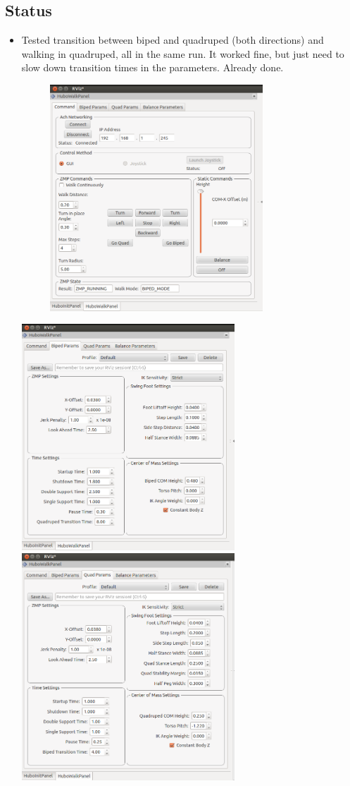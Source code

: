 \documentclass[letterpaper, 10 pt]{report}
\begin{document}
\subsection*{Status}
\begin{itemize}
\item Tested transition between biped and quadruped (both directions) and walking in quadruped, all in the same run. It worked fine, but just need to slow down transition times in the parameters. Already done.
\newline
\begin{figure}
\centering
\includegraphics[width=8.0cm]{resources/HuboWalkPanel01}
\end{figure}
\newline
\includegraphics[width=8.0cm]{resources/BipedParams01}
\includegraphics[width=8.0cm]{resources/QuadParams01}
\end{itemize}
\end{document}
